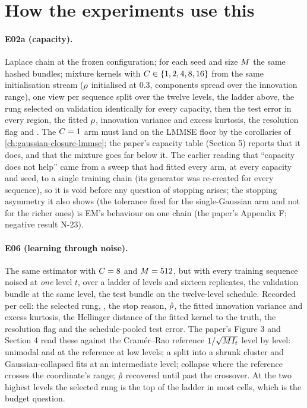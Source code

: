 \section{How the experiments use this}

\paragraph{E02a (capacity).} Laplace chain at the frozen configuration; for each seed
and size $M$ the same hashed bundles; mixture kernels with
$C\in\{1,2,4,8,16\}$ from the same initialisation stream ($\rho$ initialised at
$0.3$, components spread over the innovation range), one view per sequence split over
the twelve levels, the ladder above, the rung selected on validation identically for
every capacity, then the test error in every region, the fitted $\rho$, innovation
variance and excess kurtosis, the resolution flag and . The $C=1$ arm
must land on the LMMSE floor by the corollaries of \cref{ch:gaussian-closure-lmmse};
the paper's capacity table (Section 5) reports that it does, and that the mixture goes
far below it. The
earlier reading that ``capacity does not help'' came from a sweep that had fitted every
arm, at every capacity and seed, to a single training chain (its generator was re-created
for every sequence), so it is void before any question of stopping arises; the stopping
asymmetry it also shows (the tolerance fired for the single-Gaussian arm and not for the
richer ones) is EM's behaviour on one chain (the paper's Appendix F; negative result
N-23).

\paragraph{E06 (learning through noise).} The same estimator with $C=8$ and
$M=512$, but with every training sequence noised at \emph{one} level $t$, over a
ladder of levels and sixteen replicates, the validation bundle at the same level, the
test bundle on the twelve-level schedule. Recorded per cell: the selected rung,
, the stop reason, $\hat{\rho}$, the fitted innovation variance and excess
kurtosis, the Hellinger distance of the fitted kernel to the truth, the resolution
flag and the schedule-pooled test error. The paper's Figure 3 and Section 4 read these
against the Cram\'er--Rao reference $1/\sqrt{M I_t}$ level by level: unimodal and at
the reference at low levels; a split into a shrunk cluster and Gaussian-collapsed fits
at an intermediate level; collapse where the reference crosses the coordinate's range;
$\hat{\rho}$ recovered until past the crossover. At the two highest levels the selected
rung is the top of the ladder in most cells, which is the budget question.


